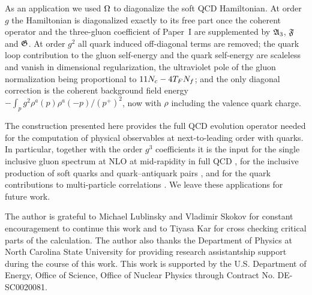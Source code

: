 As an application we used $\Omega$ to diagonalize the soft QCD Hamiltonian. At order $g$ the
Hamiltonian is diagonalized exactly to its free part once the coherent operator and the three-gluon
coefficient of Paper~I are supplemented by $\mathfrak{A}_{3}$, $\mathfrak{F}$ and $\mathfrak{G}$. At order $g^{2}$ all quark
induced off-diagonal terms are removed; the quark loop contribution to the gluon self-energy and the
quark self-energy are scaleless and vanish in dimensional regularization, the ultraviolet pole of the
gluon normalization being proportional to $11N_{c}-4T_{F}N_{f}$; and the only diagonal correction is the
coherent background field energy $-\int_{p}g^{2}\rho^{a}(p)\rho^{a}(-p)/(p^{+})^{2}$, now with $\rho$ including
the valence quark charge.

The construction presented here provides the full QCD evolution operator needed for the computation
of physical observables at next-to-leading order with quarks. In particular, together with the
order $g^{3}$ coefficients it is the input for the single inclusive gluon spectrum at NLO at
mid-rapidity in full QCD \cite{LRS:inprep}, for the inclusive production of soft quarks and
quark--antiquark pairs \cite{Blaizot:2004wv,Kovchegov:2006qn}, and for the quark contributions to
multi-particle correlations \cite{Kovner:2011pe,Altinoluk:2018byz}. We leave these applications for
future work.

\acknowledgments

The author is grateful to Michael Lublinsky and Vladimir Skokov for constant encouragement to
continue this work and to Tiyasa Kar for cross checking critical parts of the calculation. The author
also thanks the Department of Physics at North Carolina State University for providing research
assistantship support during the course of this work. This work is supported by the U.S. Department of
Energy, Office of Science, Office of Nuclear Physics through Contract No. DE-SC0020081.

